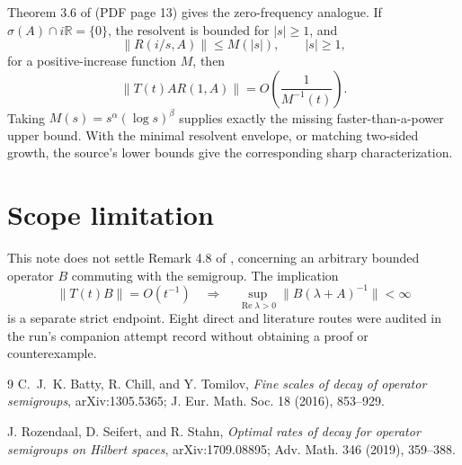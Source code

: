 \documentclass[11pt]{article}
\begin{document}
Theorem 3.6 of \cite{RSS} (PDF page 13) gives the zero-frequency analogue.
If $\sigma(A)\cap i\mathbb R=\{0\}$, the resolvent is bounded for
$|s|\ge1$, and
\[
 \|R(i/s,A)\|\le M(|s|),\qquad |s|\ge1,
\]
for a positive-increase function $M$, then
\[
 \|T(t)A R(1,A)\|=O\!\left(\frac{1}{M^{-1}(t)}\right).
\]
Taking $M(s)=s^\alpha(\log s)^\beta$ supplies exactly the missing
faster-than-a-power upper bound.  With the minimal resolvent envelope, or
matching two-sided growth, the source's lower bounds give the corresponding
sharp characterization.

\section*{Scope limitation}

This note does not settle Remark 4.8 of \cite{BCT}, concerning an arbitrary
bounded operator $B$ commuting with the semigroup.  The implication
\[
 \|T(t)B\|=O(t^{-1})
 \quad\Longrightarrow\quad
 \sup_{\operatorname{Re}\lambda>0}
 \|B(\lambda+A)^{-1}\|<\infty
\]
is a separate strict endpoint.  Eight direct and literature routes were
audited in the run's companion attempt record without obtaining a proof or
counterexample.

\begin{thebibliography}{9}
C.~J.~K. Batty, R. Chill, and Y. Tomilov,
\emph{Fine scales of decay of operator semigroups},
arXiv:1305.5365; J. Eur. Math. Soc. 18 (2016), 853--929.

J. Rozendaal, D. Seifert, and R. Stahn,
\emph{Optimal rates of decay for operator semigroups on Hilbert spaces},
arXiv:1709.08895; Adv. Math. 346 (2019), 359--388.
\end{thebibliography}
\end{document}
